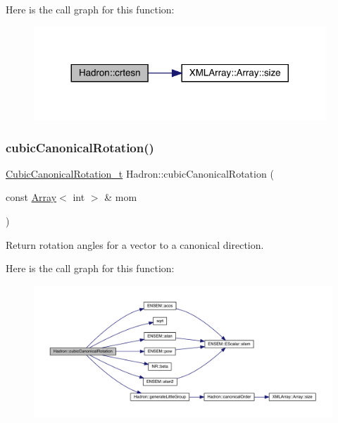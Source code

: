 Here is the call graph for this function\+:\nopagebreak
\begin{figure}[H]
\begin{center}
\leavevmode
\includegraphics[width=311pt]{d1/daf/namespaceHadron_a10fe1c3c465ac8dd8b6edab007aa6ab7_cgraph}
\end{center}
\end{figure}
\mbox{\label{namespaceHadron_ada689173e1553ad2f452af24028eae2f}} 
\subsubsection{\texorpdfstring{cubicCanonicalRotation()}{cubicCanonicalRotation()}}
{\footnotesize\ttfamily \mbox{\hyperlink{structHadron_1_1CubicCanonicalRotation__t}{Cubic\+Canonical\+Rotation\+\_\+t}} Hadron\+::cubic\+Canonical\+Rotation (\begin{DoxyParamCaption}\item[{const \mbox{\hyperlink{classXMLArray_1_1Array}{Array}}$<$ int $>$ \&}]{mom }\end{DoxyParamCaption})}



Return rotation angles for a vector to a canonical direction. 

Here is the call graph for this function\+:\nopagebreak
\begin{figure}[H]
\begin{center}
\leavevmode
\includegraphics[width=350pt]{d1/daf/namespaceHadron_ada689173e1553ad2f452af24028eae2f_cgraph}
\end{center}
\end{figure}
\mbox{\label{namespaceHadron_a2ea4a74b346adec57d30f2605fc00005}} 

